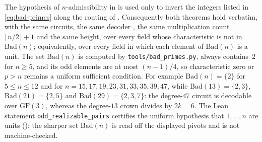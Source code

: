 \begin{remark}
\label{rem:bad-primes}
    The hypothesis of $n$-admissibility in
     is used only to
    invert the integers listed in \eqref{eq:bad-primes} along the routing
    of .  Consequently both theorems hold
    verbatim, with the same circuits, the same decoder
    , the same multiplication count
    $\lfloor n/2\rfloor+1$ and the same height, over every field whose
    characteristic is not in $\mathrm{Bad}(n)$; equivalently, over every
    field in which each element of $\mathrm{Bad}(n)$ is a unit.  The set
    $\mathrm{Bad}(n)$ is computed by \texttt{tools/bad\_primes.py}, always
    contains~$2$ for $n\ge5$, and its odd elements are at most $(n-1)/4$,
    so characteristic zero or $p>n$ remains a uniform sufficient condition.
    For example $\mathrm{Bad}(n)=\{2\}$ for $5\le n\le12$ and for
    $n=15,17,19,23,31,33,35,39,47$, while $\mathrm{Bad}(13)=\{2,3\}$,
    $\mathrm{Bad}(21)=\{2,5\}$ and $\mathrm{Bad}(29)=\{2,3,7\}$: the
    degree-$47$ circuit is decodable over $\mathrm{GF}(3)$, whereas the
    degree-$13$ crown divides by $2k=6$.  The Lean statement
    \texttt{odd\_realizable\_pairs} certifies the uniform hypothesis that
    $1,\dots,n$ are units (); the sharper
    set $\mathrm{Bad}(n)$ is read off the displayed pivots and is not
    machine-checked.
\end{remark}
